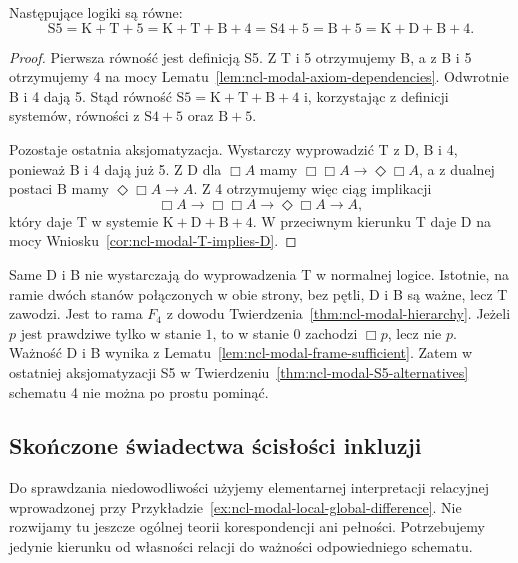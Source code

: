 \begin{twierdzenie}
\label{thm:ncl-modal-S5-alternatives}
Następujące logiki są równe:
\[
 \mathrm{S5}
 =\mathrm K+\mathrm T+5
 =\mathrm K+\mathrm T+\mathrm B+4
 =\mathrm{S4}+5
 =\mathrm B+5
 =\mathrm K+\mathrm D+\mathrm B+4.
\]
\end{twierdzenie}
\begin{proof}
Pierwsza równość jest definicją S5.
Z T i 5 otrzymujemy B, a z B i 5 otrzymujemy 4
na mocy Lematu~\ref{lem:ncl-modal-axiom-dependencies}.
Odwrotnie B i 4 dają 5. Stąd równość
$\mathrm{S5}=\mathrm K+\mathrm T+\mathrm B+4$
i, korzystając z definicji systemów,
równości z $\mathrm{S4}+5$ oraz $\mathrm B+5$.

Pozostaje ostatnia aksjomatyzacja.
Wystarczy wyprowadzić T z D, B i 4,
ponieważ B i 4 dają już 5.
Z D dla $\Box A$ mamy
$\Box\Box A\to\Diamond\Box A$,
a z dualnej postaci B mamy
$\Diamond\Box A\to A$.
Z 4 otrzymujemy więc ciąg implikacji
\[
 \Box A\to\Box\Box A\to\Diamond\Box A\to A,
\]
który daje T w systemie $\mathrm K+\mathrm D+\mathrm B+4$.
W przeciwnym kierunku T daje D na mocy
Wniosku~\ref{cor:ncl-modal-T-implies-D}.
\end{proof}

\begin{uwaga}
\label{rem:ncl-modal-DB-not-T}
Same D i B nie wystarczają do wyprowadzenia T
w normalnej logice. Istotnie,
na ramie dwóch stanów połączonych w obie strony,
bez pętli, D i B są ważne, lecz T zawodzi.
Jest to rama $F_4$ z dowodu
Twierdzenia~\ref{thm:ncl-modal-hierarchy}.
Jeżeli $p$ jest prawdziwe tylko w stanie $1$,
to w stanie $0$ zachodzi $\Box p$, lecz nie $p$.
Ważność D i B wynika z
Lematu~\ref{lem:ncl-modal-frame-sufficient}.
Zatem w ostatniej aksjomatyzacji S5 w
Twierdzeniu~\ref{thm:ncl-modal-S5-alternatives}
schematu 4 nie można po prostu pominąć.
\end{uwaga}

\subsection{Skończone świadectwa ścisłości inkluzji}

Do sprawdzania niedowodliwości użyjemy
elementarnej interpretacji relacyjnej wprowadzonej
przy Przykładzie~\ref{ex:ncl-modal-local-global-difference}.
Nie rozwijamy tu jeszcze ogólnej teorii korespondencji
ani pełności. Potrzebujemy jedynie kierunku
od własności relacji do ważności odpowiedniego
schematu.

